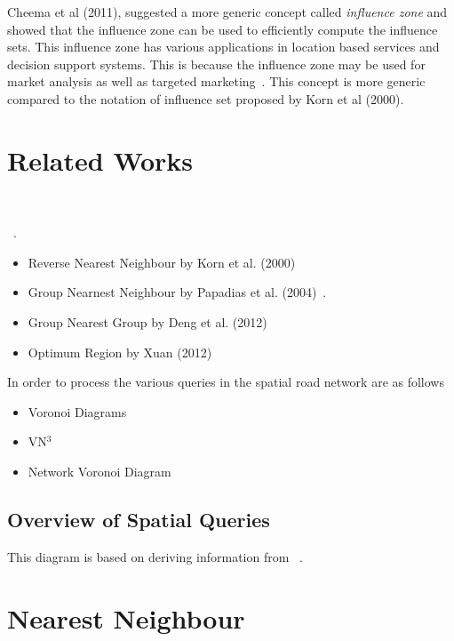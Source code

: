 \documentclass[a4paper,11pt]{article}
\begin{document}
Cheema et al (2011), suggested a more generic concept called \textit{influence zone} and showed that the influence zone can be used to efficiently compute the influence sets. This influence zone has various applications in location based services and decision support systems. This is because the influence zone may be used for market analysis as well as targeted marketing~\cite{cheema2011influence}. This concept is more generic compared to the notation of influence set proposed by Korn et al (2000). 


\section{Related Works}

~\cite{guting1994introduction}

~\cite{berchtold1998fast}.

\begin{itemize}
	\item Reverse Nearest Neighbour by Korn et al. (2000)~\cite{korn2000influence}
	\item Group Nearnest Neighbour by Papadias et al. (2004)~\cite{papadias2004group}.
	\item Group Nearest Group by Deng et al. (2012)~\cite{deng2012group}
	\item Optimum Region by Xuan (2012)~\cite{Xuan2012}
\end{itemize}

In order to process the various queries in the spatial road network are as follows

\begin{itemize}
	\item Voronoi Diagrams 
	\item VN$^3$ ~\cite{kolahdouzan2004voronoi}
	\item Network Voronoi Diagram~\cite{xuan2009network}
\end{itemize}


\subsection{Overview of Spatial Queries}

This diagram is based on deriving information from ~\cite{taniar2013taxonomy}.

\section{Nearest Neighbour}
\end{document}
